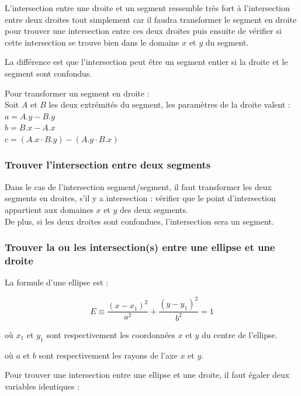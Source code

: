 \documentclass[]{report}
\begin{document}
L'intersection entre une droite et un segment ressemble très fort
à l'intersection entre deux droites tout simplement car il faudra transformer
le segment en droite pour trouver une intersection entre ces deux droites
puis ensuite de vérifier si cette intersection se trouve bien dans le domaine
$x$ et $y$ du segment.

La différence est que l'intersection peut être un segment entier si la droite
et le segment sont confondus.

Pour transformer un segment en droite : \\
Soit $A$ et $B$ les deux extrémités du segment, les paramètres de la droite valent : 
$ a = A.y - B.y $ \\
$ b = B.x - A.x $ \\
$ c = (A.x \cdot B.y) - (A.y \cdot B.x) $ \\

\subsubsection{Trouver l'intersection entre deux segments}

Dans le cas de l'intersection segment/segment, il faut transformer les
deux segments en droites, s'il y a intersection : vérifier que le point
d'intersection appartient aux domaines $x$ et $y$ des deux segments. \\
De plus, si les deux droites sont confondues, l'intersection sera un segment.

\subsubsection{Trouver la ou les intersection(s) entre une ellipse et une droite}

La formule d'une ellipse est : 

$$ E \equiv \frac{(x - x_1)^2}{a^2} + \frac{(y - y_1)^2}{b^2} = 1 $$

\begin{description}
\item où $x_1$ et $y_1$ sont respectivement les coordonnées
$x$ et $y$ du centre de l'ellipse. 
\item où $a$ et $b$ sont respectivement les rayons de l'axe
$x$ et $y$. \\
\end{description}

Pour trouver une intersection entre une ellipse
et une droite, il faut égaler deux variables 
identiques :
\end{document}
